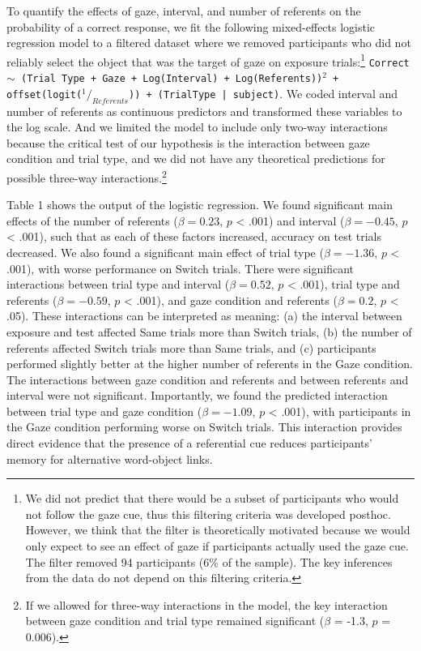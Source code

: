 \documentclass[authoryear, review]{elsarticle}
\begin{document}
To quantify the effects of gaze, interval, and number of referents on
the probability of a correct response, we fit the following
mixed-effects logistic regression model to a filtered dataset where we
removed participants who did not reliably select the object that was the
target of gaze on exposure trials:\footnote{We did not predict that
  there would be a subset of participants who would not follow the gaze
  cue, thus this filtering criteria was developed posthoc. However, we
  think that the filter is theoretically motivated because we would only
  expect to see an effect of gaze if participants actually used the gaze
  cue. The filter removed 94 participants (6\% of the sample). The key
  inferences from the data do not depend on this filtering criteria.}
\texttt{Correct $\sim$ (Trial Type + Gaze + Log(Interval) + Log(Referents))$^2$ + offset(logit($^1/_{Referents}$)) + (TrialType | subject)}.
We coded interval and number of referents as continuous predictors and
transformed these variables to the log scale. And we limited the model
to include only two-way interactions because the critical test of our
hypothesis is the interaction between gaze condition and trial type, and
we did not have any theoretical predictions for possible three-way
interactions.\footnote{If we allowed for three-way interactions in the
  model, the key interaction between gaze condition and trial type
  remained significant (\(\beta\) = -1.3, \(p\) = 0.006).}

Table 1 shows the output of the logistic regression. We found
significant main effects of the number of referents (\(\beta = 0.23\),
\(p\) \textless{} .001) and interval (\(\beta = -0.45\), \(p\)
\textless{} .001), such that as each of these factors increased,
accuracy on test trials decreased. We also found a significant main
effect of trial type (\(\beta = -1.36\), \(p\) \textless{} .001), with
worse performance on Switch trials. There were significant interactions
between trial type and interval (\(\beta = 0.52\), \(p\) \textless{}
.001), trial type and referents (\(\beta = -0.59\), \(p\) \textless{}
.001), and gaze condition and referents (\(\beta = 0.2\), \(p\)
\textless{} .05). These interactions can be interpreted as meaning: (a)
the interval between exposure and test affected Same trials more than
Switch trials, (b) the number of referents affected Switch trials more
than Same trials, and (c) participants performed slightly better at the
higher number of referents in the Gaze condition. The interactions
between gaze condition and referents and between referents and interval
were not significant. Importantly, we found the predicted interaction
between trial type and gaze condition (\(\beta = -1.09\), \(p\)
\textless{} .001), with participants in the Gaze condition performing
worse on Switch trials. This interaction provides direct evidence that
the presence of a referential cue reduces participants' memory for
alternative word-object links.
\end{document}
